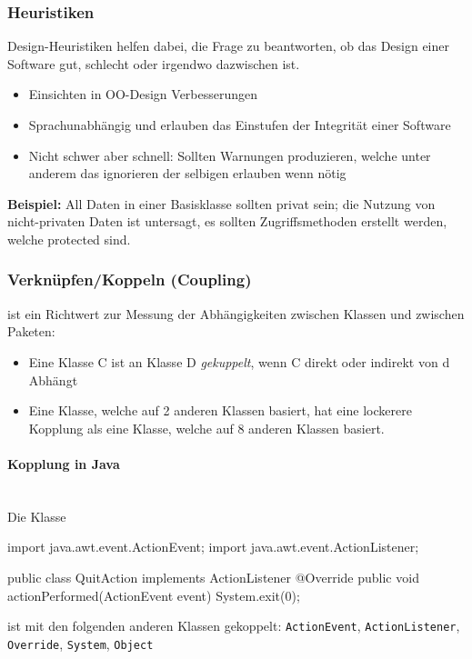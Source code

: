\documentclass[ngerman,color=3b]{tuda_summary}
\begin{document}
\subsubsection{Heuristiken}
Design-Heuristiken helfen dabei, die Frage zu beantworten, ob das Design einer Software gut, schlecht oder irgendwo dazwischen ist.
\begin{itemize}
    \item Einsichten in OO-Design Verbesserungen
    \item Sprachunabhängig und erlauben das Einstufen der Integrität einer Software
    \item Nicht schwer aber schnell: Sollten Warnungen produzieren, welche unter anderem das ignorieren der selbigen erlauben wenn nötig
\end{itemize}

\textbf{Beispiel:} All Daten in einer Basisklasse sollten privat sein; die Nutzung von nicht-privaten Daten ist untersagt, es sollten Zugriffsmethoden erstellt werden, welche protected sind.
\clearpage
\subsubsection{Verknüpfen/Koppeln (Coupling)}

\begin{definition}
    ist ein Richtwert zur Messung der Abhängigkeiten zwischen Klassen und zwischen Paketen:
    \begin{itemize}
        \item  Eine Klasse C ist an Klasse D \textit{gekuppelt}, wenn C direkt oder indirekt von d Abhängt
        \item  Eine Klasse, welche auf 2 anderen Klassen basiert, hat eine lockerere Kopplung als eine Klasse, welche auf 8 anderen Klassen basiert.
    \end{itemize}
\end{definition}

\paragraph{Kopplung in Java}\mbox{}\\
Die Klasse
\begin{codeBlock}[autogobble]{}
    import java.awt.event.ActionEvent;
    import java.awt.event.ActionListener;

    public class QuitAction implements ActionListener {
    	@Override
    	public void actionPerformed(ActionEvent event) {
    		System.exit(0);
    	}
    }
\end{codeBlock}
ist mit den folgenden anderen Klassen gekoppelt: \texttt{ActionEvent}, \texttt{ActionListener}, \texttt{Override}, \texttt{System}, \texttt{Object}
\end{document}
